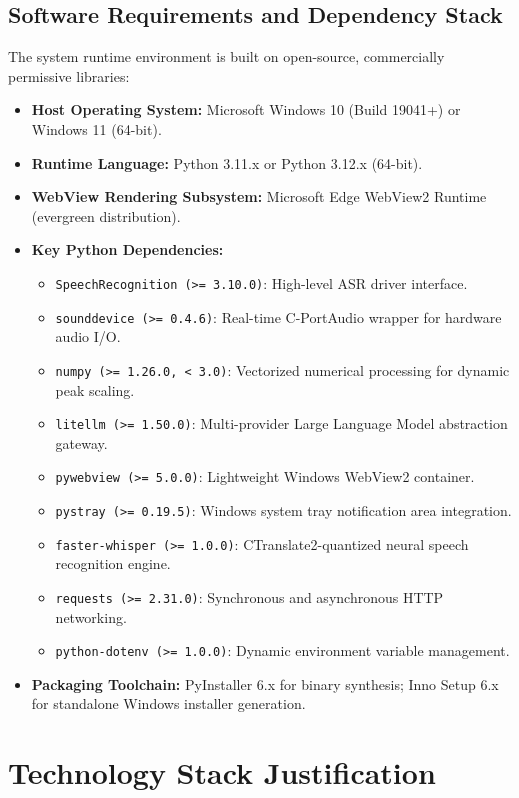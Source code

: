 \subsection{Software Requirements and Dependency Stack}
The system runtime environment is built on open-source, commercially permissive libraries:
\begin{itemize}
    \item \textbf{Host Operating System:} Microsoft Windows 10 (Build 19041+) or Windows 11 (64-bit).
    \item \textbf{Runtime Language:} Python 3.11.x or Python 3.12.x (64-bit).
    \item \textbf{WebView Rendering Subsystem:} Microsoft Edge WebView2 Runtime (evergreen distribution).
    \item \textbf{Key Python Dependencies:}
    \begin{itemize}
        \item \texttt{SpeechRecognition (>= 3.10.0)}: High-level ASR driver interface.
        \item \texttt{sounddevice (>= 0.4.6)}: Real-time C-PortAudio wrapper for hardware audio I/O.
        \item \texttt{numpy (>= 1.26.0, < 3.0)}: Vectorized numerical processing for dynamic peak scaling.
        \item \texttt{litellm (>= 1.50.0)}: Multi-provider Large Language Model abstraction gateway.
        \item \texttt{pywebview (>= 5.0.0)}: Lightweight Windows WebView2 container.
        \item \texttt{pystray (>= 0.19.5)}: Windows system tray notification area integration.
        \item \texttt{faster-whisper (>= 1.0.0)}: CTranslate2-quantized neural speech recognition engine.
        \item \texttt{requests (>= 2.31.0)}: Synchronous and asynchronous HTTP networking.
        \item \texttt{python-dotenv (>= 1.0.0)}: Dynamic environment variable management.
    \end{itemize}
    \item \textbf{Packaging Toolchain:} PyInstaller 6.x for binary synthesis; Inno Setup 6.x for standalone Windows installer generation.
\end{itemize}

\section{Technology Stack Justification}

